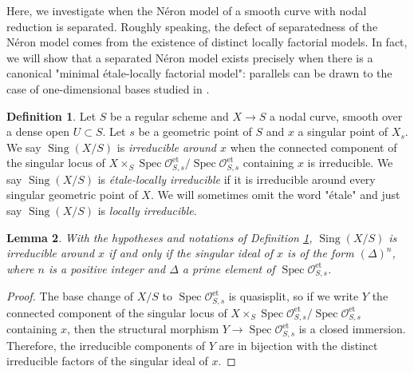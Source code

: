 \documentclass[a4paper,12pt]{amsart} %
\numberwithin{equation}{subsection}
\newcommand{\on}[1]{\operatorname{#1}}
\def\Sing{\operatorname{Sing}}
\newcommand{\Spec}{\operatorname{Spec}}
\theoremstyle{definition}
\newtheorem{definition}{Definition}[section]
\theoremstyle{plain}%
\newtheorem{lemma}[definition]{Lemma}
\newtheorem{corollary}[definition]{Corollary}
\theoremstyle{remark}
\renewcommand{\O}{\mathcal{O}}
\begin{document}
Here, we investigate when the Néron model of a smooth curve with nodal reduction is separated. Roughly speaking, the defect of separatedness of the N\'eron model comes from the existence of distinct locally factorial models. In fact, we will show that a separated N\'eron model exists precisely when there is a canonical "minimal \'etale-locally factorial model": parallels can be drawn to the case of one-dimensional bases studied in \cite{LiuTong}.

\begin{definition}\label{Purete d'une courbe nodal}
	Let $S$ be a regular scheme and $X\to S$ a nodal curve, smooth over a dense open $U\subset S$. Let $s$ be a geometric point of $S$ and $x$ a singular point of $X_s$. We say $\Sing(X/S)$ is \emph{irreducible around $x$} when the connected component of the singular locus of $X\times_S\Spec\O_{S,s}^{\on{et}}/\Spec\O_{S,s}^{\on{et}}$ containing $x$ is irreducible. We say $\Sing(X/S)$ is \emph{étale-locally irreducible} if it is irreducible around every singular geometric point of $X$. We will sometimes omit the word "\'etale" and just say $\Sing(X/S)$ is \emph{locally irreducible}.
\end{definition}	

\begin{lemma}
	With the hypotheses and notations of Definition \ref{Purete d'une courbe nodal}, $\Sing(X/S)$ is irreducible around $x$ if and only if the singular ideal of $x$ is of the form $(\Delta)^n$, where $n$ is a positive integer and $\Delta$ a prime element of $\Spec\O_{S,s}^{\on{et}}$.
\end{lemma}

\begin{proof}
The base change of $X/S$ to $\Spec\O_{S,s}^{\on{et}}$ is quasisplit, so if we write $Y$ the connected component of the singular locus of $X\times_S\Spec\O_{S,s}^{\on{et}}/\Spec\O_{S,s}^{\on{et}}$ containing $x$, then the structural morphism $Y\to \Spec\O_{S,s}^{\on{et}}$ is a closed immersion. Therefore, the irreducible components of $Y$ are in bijection with the distinct irreducible factors of the singular ideal of $x$.
\end{proof}

\end{document}

